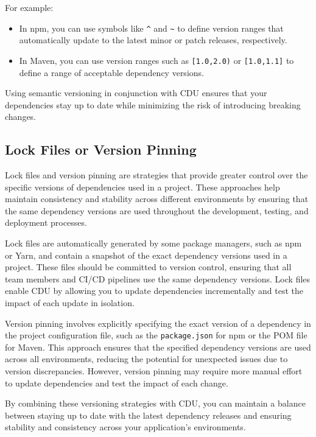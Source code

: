 \documentclass[10pt]{article}
\begin{document}
For example:

\begin{itemize}

  \item In npm, you can use symbols like \texttt{\^{}} and \texttt{\~{}} to define version ranges that automatically update to the latest minor or patch releases, respectively.

  \item In Maven, you can use version ranges such as \texttt{[1.0,2.0)} or \texttt{[1.0,1.1]} to define a range of acceptable dependency versions.

\end{itemize}

Using semantic versioning in conjunction with CDU ensures that your dependencies stay up to date while minimizing the risk of introducing breaking changes.

\subsection*{Lock Files or Version Pinning}

Lock files and version pinning are strategies that provide greater control over the specific versions of dependencies used in a project. These approaches help maintain consistency and stability across different environments by ensuring that the same dependency versions are used throughout the development, testing, and deployment processes.

Lock files are automatically generated by some package managers, such as npm or Yarn, and contain a snapshot of the exact dependency versions used in a project. These files should be committed to version control, ensuring that all team members and CI/CD pipelines use the same dependency versions. Lock files enable CDU by allowing you to update dependencies incrementally and test the impact of each update in isolation.

Version pinning involves explicitly specifying the exact version of a dependency in the project configuration file, such as the \texttt{package.json} for npm or the POM file for Maven. This approach ensures that the specified dependency versions are used across all environments, reducing the potential for unexpected issues due to version discrepancies. However, version pinning may require more manual effort to update dependencies and test the impact of each change.

By combining these versioning strategies with CDU, you can maintain a balance between staying up to date with the latest dependency releases and ensuring stability and consistency across your application's environments.
\end{document}
